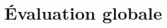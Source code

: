 \documentclass[11pt, a4paper]{book}
\begin{document}
\setcounter{chapter}{5}

\tableofcontents

\chapter{Évaluation globale}





\end{document}
